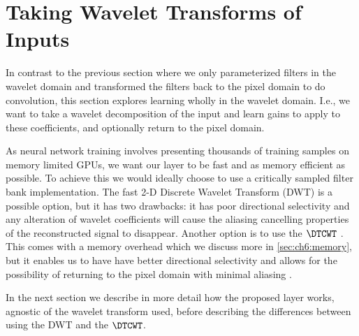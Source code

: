 \section{Taking Wavelet Transforms of Inputs}\label{sec:ch6:gainlayer}

In contrast to the previous section where we only parameterized filters in the
wavelet domain and transformed the filters back to the pixel domain to do
convolution, this section explores learning wholly in the wavelet domain. I.e.,
we want to take a wavelet decomposition of the input and learn gains to apply to
these coefficients, and optionally return to the pixel domain.

As neural network training involves presenting thousands of training samples on
memory limited GPUs, we want our layer to be fast and as memory efficient as
possible. To achieve this we would ideally choose to use a critically sampled
filter bank implementation.  The fast 2-D Discrete Wavelet Transform (DWT) is a
possible option, but it has two drawbacks: it has poor directional selectivity
and any alteration of wavelet coefficients will cause the aliasing cancelling
properties of the reconstructed signal to disappear. Another option is to use
the $\DTCWT$ \cite{selesnick_dual-tree_2005}. This comes with a memory overhead
which we discuss more in \autoref{sec:ch6:memory}, but it enables us to have
have better directional selectivity and allows for the possibility of returning
to the pixel domain with minimal aliasing \cite{kingsbury_complex_2001}.

In the next section we describe in more detail how the proposed layer works,
agnostic of the wavelet transform used, before describing the differences between
using the DWT and the $\DTCWT$.




